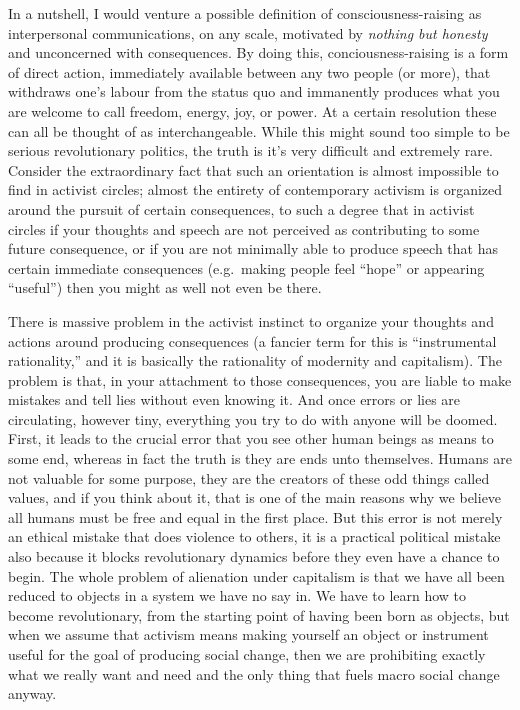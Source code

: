 \documentclass[a4paper,12pt,margin=.5in]{article}
\begin{document}
In a nutshell, I would venture a possible definition of
consciousness-raising as interpersonal communications, on any scale,
motivated by \emph{nothing but honesty} and unconcerned with
consequences. By doing this, conciousness-raising is a form of direct
action, immediately available between any two people (or more), that
withdraws one's labour from the status quo and immanently produces what
you are welcome to call freedom, energy, joy, or power. At a certain
resolution these can all be thought of as interchangeable. While this
might sound too simple to be serious revolutionary politics, the truth
is it's very difficult and extremely rare. Consider the extraordinary
fact that such an orientation is almost impossible to find in activist
circles; almost the entirety of contemporary activism is organized
around the pursuit of certain consequences, to such a degree that in
activist circles if your thoughts and speech are not perceived as
contributing to some future consequence, or if you are not minimally
able to produce speech that has certain immediate consequences
(e.g.~making people feel ``hope'' or appearing ``useful'') then you
might as well not even be there.

There is massive problem in the activist instinct to organize your
thoughts and actions around producing consequences (a fancier term for
this is ``instrumental rationality,'' and it is basically the
rationality of modernity and capitalism). The problem is that, in your
attachment to those consequences, you are liable to make mistakes and
tell lies without even knowing it. And once errors or lies are
circulating, however tiny, everything you try to do with anyone will be
doomed. First, it leads to the crucial error that you see other human
beings as means to some end, whereas in fact the truth is they are ends
unto themselves. Humans are not valuable for some purpose, they are the
creators of these odd things called values, and if you think about it,
that is one of the main reasons why we believe all humans must be free
and equal in the first place. But this error is not merely an ethical
mistake that does violence to others, it is a practical political
mistake also because it blocks revolutionary dynamics before they even
have a chance to begin. The whole problem of alienation under capitalism
is that we have all been reduced to objects in a system we have no say
in. We have to learn how to become revolutionary, from the starting
point of having been born as objects, but when we assume that activism
means making yourself an object or instrument useful for the goal of
producing social change, then we are prohibiting exactly what we really
want and need and the only thing that fuels macro social change anyway.
\end{document}

